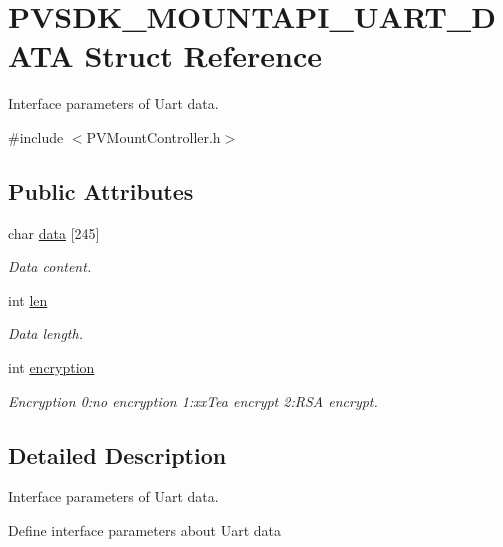 \hypertarget{struct_p_v_s_d_k___m_o_u_n_t_a_p_i___u_a_r_t___d_a_t_a}{}\section{P\+V\+S\+D\+K\+\_\+\+M\+O\+U\+N\+T\+A\+P\+I\+\_\+\+U\+A\+R\+T\+\_\+\+D\+A\+TA Struct Reference}
\label{struct_p_v_s_d_k___m_o_u_n_t_a_p_i___u_a_r_t___d_a_t_a}


Interface parameters of Uart data.  




{\ttfamily \#include $<$P\+V\+Mount\+Controller.\+h$>$}

\subsection*{Public Attributes}
\begin{DoxyCompactItemize}
\item 
char \hyperlink{struct_p_v_s_d_k___m_o_u_n_t_a_p_i___u_a_r_t___d_a_t_a_a4a1d8fa3b43a0821976b89fb31e14fe4}{data} \mbox{[}245\mbox{]}
\begin{DoxyCompactList}\small\item\em Data content. \end{DoxyCompactList}\item 
int \hyperlink{struct_p_v_s_d_k___m_o_u_n_t_a_p_i___u_a_r_t___d_a_t_a_a5b6b55be53d9320470fa93475c8f23ab}{len}
\begin{DoxyCompactList}\small\item\em Data length. \end{DoxyCompactList}\item 
int \hyperlink{struct_p_v_s_d_k___m_o_u_n_t_a_p_i___u_a_r_t___d_a_t_a_a2720a12b8fdf29c8cb9b667c9615e42c}{encryption}
\begin{DoxyCompactList}\small\item\em Encryption 0\+:no encryption 1\+:xx\+Tea encrypt 2\+:R\+SA encrypt. \end{DoxyCompactList}\end{DoxyCompactItemize}


\subsection{Detailed Description}
Interface parameters of Uart data. 

Define interface parameters about Uart data 

